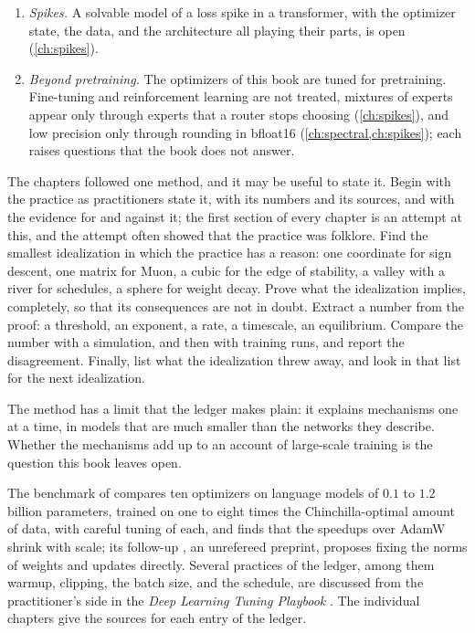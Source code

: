 \begin{refsection}
\begin{enumerate}
\item \emph{Spikes.} A solvable model of a loss spike in a transformer, with the optimizer state, the data, and the architecture all playing their parts, is open (\cref{ch:spikes}).
\item \emph{Beyond pretraining.} The optimizers of this book are tuned for pretraining. Fine-tuning and reinforcement learning are not treated, mixtures of experts appear only through experts that a router stops choosing (\cref{ch:spikes}), and low precision only through rounding in bfloat16 (\cref{ch:spectral,ch:spikes}); each raises questions that the book does not answer.
\end{enumerate}


The chapters followed one method, and it may be useful to state it. Begin with the practice as practitioners state it, with its numbers and its sources, and with the evidence for and against it; the first section of every chapter is an attempt at this, and the attempt often showed that the practice was folklore. Find the smallest idealization in which the practice has a reason: one coordinate for sign descent, one matrix for Muon, a cubic for the edge of stability, a valley with a river for schedules, a sphere for weight decay. Prove what the idealization implies, completely, so that its consequences are not in doubt. Extract a number from the proof: a threshold, an exponent, a rate, a timescale, an equilibrium. Compare the number with a simulation, and then with training runs, and report the disagreement. Finally, list what the idealization threw away, and look in that list for the next idealization.

The method has a limit that the ledger makes plain: it explains mechanisms one at a time, in models that are much smaller than the networks they describe. Whether the mechanisms add up to an account of large-scale training is the question this book leaves open.

\notesandrefs

The benchmark of \textcite{WenEtAl2026Fantastic} compares ten optimizers on language models of $0.1$ to $1.2$ billion parameters, trained on one to eight times the Chinchilla-optimal amount of data, with careful tuning of each, and finds that the speedups over AdamW shrink with scale; its follow-up \parencite{WenEtAl2026Hyperball}, an unrefereed preprint, proposes fixing the norms of weights and updates directly. Several practices of the ledger, among them warmup, clipping, the batch size, and the schedule, are discussed from the practitioner's side in the \emph{Deep Learning Tuning Playbook} \parencite{GodboleEtAl2023}. The individual chapters give the sources for each entry of the ledger.

\printchapterbib
\end{refsection}
